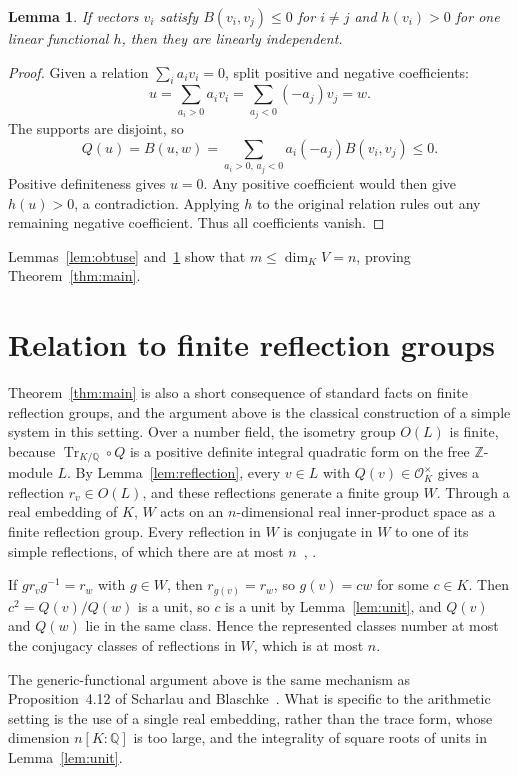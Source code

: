 \documentclass[11pt]{article}
\newtheorem{lemma}[theorem]{Lemma}
\newcommand{\OK}{\mathcal O_K}
\newcommand{\Q}{\mathbb Q}
\newcommand{\Z}{\mathbb Z}
\begin{document}
\begin{lemma}\label{lem:independent}
If vectors $v_i$ satisfy $B(v_i,v_j)\leq0$ for $i\ne j$ and $h(v_i)>0$ for one linear functional $h$, then they are linearly independent.
\end{lemma}
\begin{proof}
Given a relation $\sum_i a_i v_i=0$, split positive and negative coefficients:
\[
 u=\sum_{a_i>0}a_i v_i
   =\sum_{a_j<0}(-a_j)v_j=w.
\]
The supports are disjoint, so
\[
 Q(u)=B(u,w)=\sum_{a_i>0,\,a_j<0}a_i(-a_j)B(v_i,v_j)\leq0.
\]
Positive definiteness gives $u=0$. Any positive coefficient would then give $h(u)>0$, a contradiction. Applying $h$ to the original relation rules out any remaining negative coefficient. Thus all coefficients vanish.
\end{proof}

Lemmas~\ref{lem:obtuse} and~\ref{lem:independent} show that $m\leq\dim_K V=n$, proving Theorem~\ref{thm:main}.

\section{Relation to finite reflection groups}\label{sec:coxeter}
Theorem~\ref{thm:main} is also a short consequence of standard facts on finite reflection groups, and the argument above is the classical construction of a simple system in this setting. Over a number field, the isometry group $O(L)$ is finite, because $\operatorname{Tr}_{K/\Q}\circ Q$ is a positive definite integral quadratic form on the free $\Z$-module $L$. By Lemma~\ref{lem:reflection}, every $v\in L$ with $Q(v)\in\OK^\times$ gives a reflection $r_v\in O(L)$, and these reflections generate a finite group $W$. Through a real embedding of $K$, $W$ acts on an $n$-dimensional real inner-product space as a finite reflection group. Every reflection in $W$ is conjugate in $W$ to one of its simple reflections, of which there are at most $n$~\cite[Sections~1.5 and~1.14]{Hum}, \cite[Chapter~V]{Bou}.

If $g r_v g^{-1}=r_w$ with $g\in W$, then $r_{g(v)}=r_w$, so $g(v)=cw$ for some $c\in K$. Then $c^2=Q(v)/Q(w)$ is a unit, so $c$ is a unit by Lemma~\ref{lem:unit}, and $Q(v)$ and $Q(w)$ lie in the same class. Hence the represented classes number at most the conjugacy classes of reflections in $W$, which is at most $n$.

The generic-functional argument above is the same mechanism as Proposition~4.12 of Scharlau and Blaschke~\cite{SB}. What is specific to the arithmetic setting is the use of a single real embedding, rather than the trace form, whose dimension $n[K:\Q]$ is too large, and the integrality of square roots of units in Lemma~\ref{lem:unit}.
\end{document}
